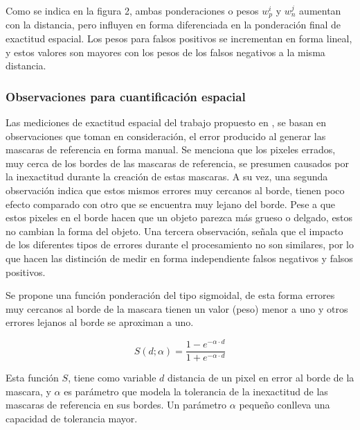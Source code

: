 Como se indica en la figura 2, ambas ponderaciones o pesos $w^i_p$ y $w^j_n$ aumentan con la distancia, pero influyen en forma diferenciada en la ponderación final de exactitud espacial. Los pesos para falsos positivos se incrementan en forma lineal, y estos valores son mayores con los pesos de los falsos negativos a la misma distancia.

\subsubsection{Observaciones para cuantificación espacial}

Las mediciones de exactitud espacial del trabajo propuesto en \cite{liu_metrics_2011}, se basan en observaciones que toman en consideración, el error producido al generar las mascaras de referencia en forma manual. Se menciona que los pixeles errados, muy cerca de los bordes de las mascaras de referencia, se presumen causados por la inexactitud durante la creación de estas mascaras. A su vez, una segunda observación indica que estos mismos errores muy cercanos al borde, tienen poco efecto comparado con otro que se encuentra muy lejano del borde. Pese a que estos pixeles en el borde hacen que un objeto parezca más grueso o delgado, estos no cambian la forma del objeto. Una tercera observación, señala que el impacto de los diferentes tipos de errores durante el procesamiento no son similares, por lo que hacen las distinción de medir en forma independiente falsos negativos y falsos positivos. 

Se propone una función ponderación del tipo sigmoidal, de esta forma errores muy cercanos al borde de la mascara tienen un valor (peso) menor a uno y otros errores lejanos al borde se aproximan a uno. 

\begin{equation}
S(d;\alpha) = \frac{1 - e^{-\alpha \cdot d}}{1 + e^{-\alpha \cdot d}}
\end{equation}

Esta función $S$, tiene como variable $d$ distancia de un pixel en error al borde de la mascara, y $\alpha$ es parámetro que modela la tolerancia de la inexactitud de las mascaras de referencia en sus bordes. Un parámetro $\alpha$ pequeño conlleva una capacidad de tolerancia mayor. 


